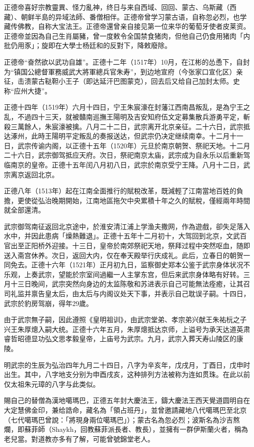正德帝喜好宗教靈異、怪力亂神，终日与来自西域、回回、蒙古、乌斯藏（西藏）、朝鲜半島的异域法師、番僧相伴。正德帝曾学习蒙古语，自称忽必烈，也学藏传佛教，自称大宝法王。正德帝還曾亲自接见第一位来华的葡萄牙使者皮莱资。正德帝並因為自己生肖屬豬，曾一度敕令全国禁食猪肉，但他自己仍食用猪肉「内批仍用豕」；旋即在大學士杨廷和的反對下，降敕廢除。

正德帝“奋然欲以武功自雄”。正德十二年（1517年）10月，在江彬的怂恿下，自封为“镇国公總督軍務威武大將軍總兵官朱寿”，到边地宣府（今张家口宣化区）亲征，击溃蒙古鞑靼小王子（即达延汗巴图蒙克），回去后又给自己加封太师。史称“应州大捷”。

正德十四年（1519年）六月十四日，宁王朱宸濠在封藩江西南昌叛乱，是為宁王之乱，不過四十三天，就被贛南巡撫王陽明及吉安知府伍文定募集散兵游勇平定，斬殺三萬餘人，朱宸濠被擒。八月二十二日，武宗离开北京亲征。二十六日，武宗抵达涿州，此時王陽明平定叛乱的奏报送达，但武宗仍决定继续南幸。十二月十一日，武宗传谕内阁，以正德十五年（1520年）元旦於南京朝贺、祭祀天地。十二月二十六日，武宗御驾抵应天府。次日，祭祀南京太庙，武宗成为自永乐以后重新驾临南京的皇帝。正德十五年闰八月初八日，武宗於南京受宁王降。八月十二日，武宗离京返回北京。

正德八年（1513年）起在江南全面推行的賦稅改革，既減輕了江南當地百姓的負擔，更使從弘治晚期開始，江南地區拖欠中央累積十年之久的賦稅，僅經兩年時間就全部還清。

武宗御驾南征返回北京途中，於淮安清江浦上学渔夫撒网，作為遊戲，卻失足落入水中，并因此患病「燥熱難退」。正德十五年十二月初十，大驾回到北京，文武百官出至正阳桥外迎接。十三日，皇帝於南郊祭祀天地，祭拜过程中突然呕血，随即送入斋宫休养。次日，返回大内，仅在奉天殿举行庆成礼。此后，立春日的朝贺一同免去。正德十六年（1521年）正月初九日，监察御史郑本公鉴于武宗身体状况不乐观，上奏武宗，望能於宗室间過繼一人主掌东宫，但后来武宗身体略有好转。三月十三日晚间，武宗突然向身边的太监陈敬和苏进表示自己可能無法痊癒，让其召司礼监并禀告皇太后，由太后与内阁议处天下事，并表示自己耽误子嗣。十四日，武宗於豹房驾崩，得年29歲。

由于武宗無子嗣，因此遵照《皇明祖训》，由武宗堂弟、孝宗弟兴献王朱祐杬之子兴王朱厚熜入嗣大统。正德十六年五月，朱厚熜抵达京师，上谥号为承天达道英肃睿哲昭德显功弘文思孝毅皇帝，上庙号为武宗。九月，武宗入葬天寿山陵区的康陵。

明武宗的生辰为弘治四年九月二十四日，八字为辛亥年，戊戌月，丁酉日，戊申时出生。其中，八字地支分别为申酉戌亥，这种排列方法被称为连如贯珠。在此以前仅太祖朱元璋的八字与此类似。

賜自己的替僧為漢地噶瑪巴，正德五年封大慶法王，鑄大慶法王西天覺道圆明自在大定慧佛金印，兼给誥命，藏名為「領占班丹」，並曾邀請藏地八代噶瑪巴至北京（七代噶瑪巴曾說：「將現身兩位噶瑪巴」）；蒙古名為忽必烈；波斯名為沙吉熬爛，即蘇菲師（Shaykh，回教蘇菲派長者、教長），並擁有一群伊斯蘭火者，稱為老兒當。對道教亦多有了解，可能曾號錦堂老人。

